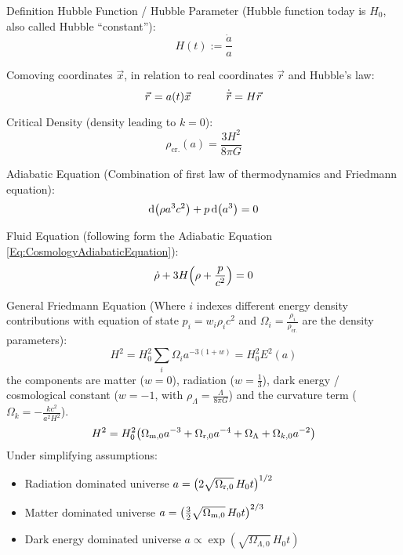 		\noindent
		Definition Hubble Function / Hubble Parameter{} (Hubble function today is $H_0$, also called Hubble ``constant''):
		\begin{equation}
			H(t) := \frac{\dot{a}}{a}
		\end{equation}

		\noindent
		Comoving coordinates $\vec{x}$, in relation to real coordinates $\vec{r}$ and Hubble's law:
		\begin{equation}
			\vec{r} = a(t) \vec{x}
			\hsp
			\dot{\vec{r}} = H \vec{r}
		\end{equation}

		\noindent
		Critical Density (\ie density leading to $k=0$):
		\begin{equation}
			\rho_\text{cr.} (a) = \frac{3 H^2}{8 \pi G}
		\end{equation}

		\noindent
		Adiabatic Equation (Combination of first law of thermodynamics and Friedmann equation):
		\begin{equation}
			\label{Eq:CosmologyAdiabaticEquation}
			\dd \qty(\rho a^3 c^2) + p \dd (a^3) = 0
		\end{equation}

		\noindent
		Fluid Equation (following form the Adiabatic Equation \ref{Eq:CosmologyAdiabaticEquation}):
		\begin{equation}
			\dot{\rho} + 3 H \qty(\rho + \frac{p}{c^2}) = 0
		\end{equation}

		\noindent
		General Friedmann Equation (Where $i$ indexes different energy density contributions with equation of state $p_i = w_i \rho_i c^2$ and $\Omega_i = \frac{\rho_i}{\rho_\text{cr.}}$ are the density parameters):
		\begin{equation}
			H^2 = H_0^2\sum_i \Omega_i a^{-3(1+w)} = H_0^2 E^2(a)
		\end{equation}
		the components are matter ($w=0$), radiation ($w=\frac{1}{3}$), dark energy / cosmological constant ($w=-1$, with $\rho_\Lambda = \frac{\Lambda}{8\pi G}$) and the curvature term ($\Omega_{k}=-\frac{k c^2}{a^2 H^2}$).
		\begin{equation}
			H^2 = H_0^2 \qty(\Omega_{\text{m},0} a^{-3} + \Omega_{\text{r},0} a^{-4} + \Omega_{\Lambda} + \Omega_{k,0} a^{-2})
		\end{equation}
		Under simplifying assumptions:
		\begin{itemize}
			\item Radiation dominated universe $a = \qty(2\sqrt{\Omega_{\text{r},0}} \, H_0 t)^{1/2}$
			\item Matter dominated universe $a = \qty(\frac{3}{2}\sqrt{\Omega_{\text{m},0}} \, H_0 t)^{2/3}$
			\item Dark energy dominated universe $a \propto \exp(\sqrt{\Omega_{\Lambda,0}} \, H_0 t)$
		\end{itemize}

